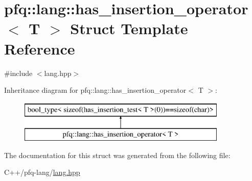\hypertarget{structpfq_1_1lang_1_1has__insertion__operator}{\section{pfq\+:\+:lang\+:\+:has\+\_\+insertion\+\_\+operator$<$ T $>$ Struct Template Reference}
\label{structpfq_1_1lang_1_1has__insertion__operator}
}


{\ttfamily \#include $<$lang.\+hpp$>$}

Inheritance diagram for pfq\+:\+:lang\+:\+:has\+\_\+insertion\+\_\+operator$<$ T $>$\+:\begin{figure}[H]
\begin{center}
\leavevmode
\includegraphics[height=2.000000cm]{structpfq_1_1lang_1_1has__insertion__operator}
\end{center}
\end{figure}


The documentation for this struct was generated from the following file\+:\begin{DoxyCompactItemize}
\item 
C++/pfq-\/lang/\hyperlink{lang_8hpp}{lang.\+hpp}\end{DoxyCompactItemize}
